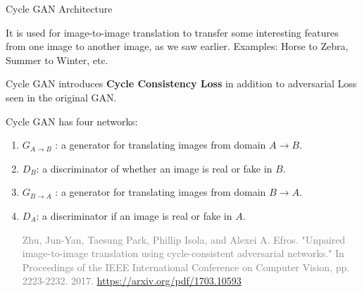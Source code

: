 \documentclass[aspectratio=169,xcolor=dvipsnames,svgnames,x11names,fleqn]{beamer}
\begin{document}
\begin{frame}{Cycle GAN Architecture}

It is used for image-to-image translation to transfer some interesting features from one image to another image, as we saw earlier. Examples: Horse to Zebra, Summer to Winter, etc.

Cycle GAN introduces \textbf{Cycle Consistency Loss} in addition to adversarial Loss seen in the original GAN.

Cycle GAN has four networks:

\begin{enumerate}
\item $G_{A\to B}$ : a generator for translating images from domain $ A \to B$.

\item $D_B$: a discriminator of whether an image is real or fake in $B$.

\item $G_{B\to A}$ : a generator for translating images from domain $ B \to A$.

\item $D_A$: a discriminator if an image is real or fake in $A$.

  
        \begin{tcolorbox}[colback=gray!10, boxrule=0pt, frame hidden, left=0pt, right=0pt, top=2pt, bottom=2pt]
    \tiny \textcolor{gray}{Zhu, Jun-Yan, Taesung Park, Phillip Isola, and Alexei A. Efros. "Unpaired image-to-image translation using cycle-consistent adversarial networks." In Proceedings of the IEEE International Conference on Computer Vision, pp. 2223-2232. 2017. \url{https://arxiv.org/pdf/1703.10593}}
\end{tcolorbox}



\end{enumerate}



\end{frame}
\end{document}
